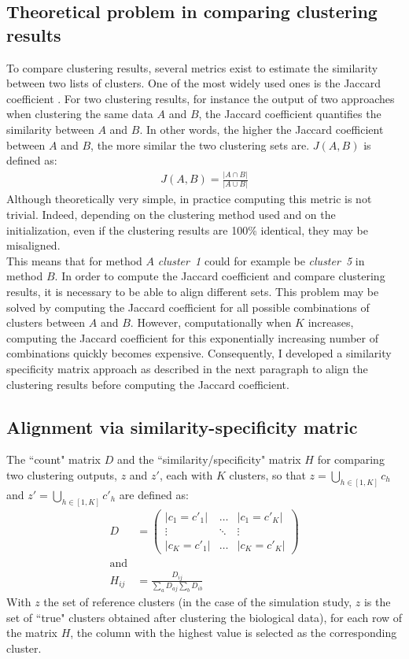 	\subsection{Theoretical problem in comparing clustering results}
To compare clustering results, several metrics exist to estimate the similarity between two lists of clusters. One of the most widely used ones is the Jaccard coefficient \cite{jaccard1901}. For two clustering results, for instance the output of two approaches when clustering the same data $A$ and $B$, the Jaccard coefficient quantifies the similarity between $A$ and $B$. In other words, the higher the Jaccard coefficient between $A$ and $B$, the more similar the two clustering sets are. $J(A,B)$ is defined as: 
\begin{align*}
J(A,B) = \frac{|A \cap B|}{|A \cup B|}
\end{align*}
Although theoretically very simple, in practice computing this metric is not trivial. Indeed, depending on the clustering method used and on the initialization, even if the clustering results are 100\% identical, they may be misaligned.\\

This means that for method $A$ \emph{cluster~1} could for example be \emph{cluster~5} in method $B$. In order to compute the Jaccard coefficient and compare clustering results, it is necessary to be able to align different sets. This problem may be solved by computing the Jaccard coefficient for all possible combinations of clusters between $A$ and $B$. However, computationally when $K$ increases, computing the Jaccard coefficient for this exponentially increasing number of combinations quickly becomes expensive. Consequently, I developed a similarity specificity matrix approach as described in the next paragraph to align the clustering results before computing the Jaccard coefficient.


	\subsection{Alignment via similarity-specificity matric}
The ``count" matrix $D$ and the ``similarity/specificity" matrix $H$ for comparing two clustering outputs, $z$ and $z'$, each with $K$ clusters, so that $z = \bigcup_{h \in [1,K]} c_h $ and $z' = \bigcup_{h \in [1,K]} c'_h$ are defined as:
\begin{align*}
D &= \left( \begin{array} {ccc}
|c_1 = c'_1| & \ldots  & |c_1 = c'_K|\\
\vdots & \ddots & \vdots\\
|c_K = c'_1| & \ldots & |c_K = c'_K| \end{array} \right)\\
\text{and}\\
H_{ij} &= \frac{D_{ij}}{\sum_{a} D_{aj} \sum_{b} D_{ib}} 
\end{align*}
With $z$ the set of reference clusters (in the case of the simulation study, $z$ is the set of ``true" clusters obtained after clustering the biological data), for each row of the matrix $H$, the column with the highest value is selected as the corresponding cluster.\\

